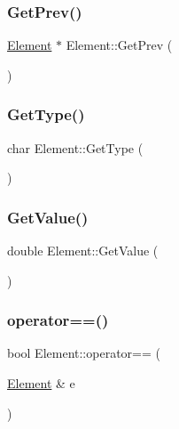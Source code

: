 \subsubsection{\texorpdfstring{Get\+Prev()}{GetPrev()}}
{\footnotesize\ttfamily \hyperlink{class_element}{Element} $\ast$ Element\+::\+Get\+Prev (\begin{DoxyParamCaption}{ }\end{DoxyParamCaption})}

\mbox{\label{class_element_abf168ef6eb9292ad9878de3927382988}} 
\subsubsection{\texorpdfstring{Get\+Type()}{GetType()}}
{\footnotesize\ttfamily char Element\+::\+Get\+Type (\begin{DoxyParamCaption}{ }\end{DoxyParamCaption})}

\mbox{\label{class_element_a0bdfb4632264f577549e3d63a96d873a}} 
\subsubsection{\texorpdfstring{Get\+Value()}{GetValue()}}
{\footnotesize\ttfamily double Element\+::\+Get\+Value (\begin{DoxyParamCaption}{ }\end{DoxyParamCaption})}

\mbox{\label{class_element_a27fd8cbd0279307253208407944edfc9}} 
\subsubsection{\texorpdfstring{operator==()}{operator==()}}
{\footnotesize\ttfamily bool Element\+::operator== (\begin{DoxyParamCaption}\item[{\hyperlink{class_element}{Element} \&}]{e }\end{DoxyParamCaption})}



